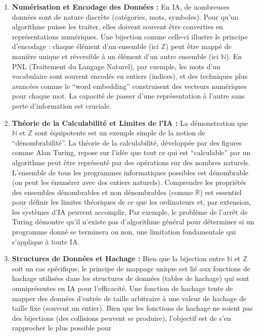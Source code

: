 \documentclass[12pt,a4paper]{report}
\begin{document}
\begin{enumerate}
\def\labelenumi{\arabic{enumi}.}
\item
  \textbf{Numérisation et Encodage des Données :} En IA, de nombreuses
  données sont de nature discrète (catégories, mots, symboles). Pour
  qu'un algorithme puisse les traiter, elles doivent souvent être
  converties en représentations numériques. Une bijection comme celle-ci
  illustre le principe d'encodage : chaque élément d'un ensemble (ici
  \(\mathbb{Z}\)) peut être mappé de manière unique et réversible à un
  élément d'un autre ensemble (ici \(\mathbb{N}\)). En PNL (Traitement
  du Langage Naturel), par exemple, les mots d'un vocabulaire sont
  souvent encodés en entiers (indices), et des techniques plus avancées
  comme le ``word embedding'' construisent des vecteurs numériques pour
  chaque mot. La capacité de passer d'une représentation à l'autre sans
  perte d'information est cruciale.
\item
  \textbf{Théorie de la Calculabilité et Limites de l'IA :} La
  démonstration que \(\mathbb{N}\) et \(\mathbb{Z}\) sont équipotents
  est un exemple simple de la notion de ``dénombrabilité''. La théorie
  de la calculabilité, développée par des figures comme Alan Turing,
  repose sur l'idée que tout ce qui est ``calculable'' par un algorithme
  peut être représenté par des opérations sur des nombres naturels.
  L'ensemble de tous les programmes informatiques possibles est
  dénombrable (on peut les énumérer avec des entiers naturels).
  Comprendre les propriétés des ensembles dénombrables et non
  dénombrables (comme \(\mathbb{R}\)) est essentiel pour définir les
  limites théoriques de ce que les ordinateurs et, par extension, les
  systèmes d'IA peuvent accomplir. Par exemple, le problème de l'arrêt
  de Turing démontre qu'il n'existe pas d'algorithme général pour
  déterminer si un programme donné se terminera ou non, une limitation
  fondamentale qui s'applique à toute IA.
\item
  \textbf{Structures de Données et Hachage :} Bien que la bijection
  entre \(\mathbb{N}\) et \(\mathbb{Z}\) soit un cas spécifique, le
  principe de mappage unique est lié aux fonctions de hachage utilisées
  dans les structures de données (tables de hachage) qui sont
  omniprésentes en IA pour l'efficacité. Une fonction de hachage tente
  de mapper des données d'entrée de taille arbitraire à une valeur de
  hachage de taille fixe (souvent un entier). Bien que les fonctions de
  hachage ne soient pas des bijections (des collisions peuvent se
  produire), l'objectif est de s'en rapprocher le plus possible pour

\end{enumerate}
\end{document}
